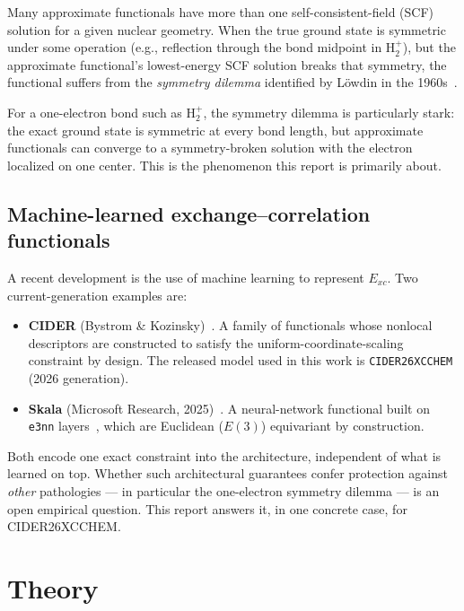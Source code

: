 \documentclass[11pt]{report}
\theoremstyle{definition}
\theoremstyle{remark}
\newcommand{\Exc}{E_{xc}}
\begin{document}
Many approximate functionals have more than one self-consistent-field (SCF)
solution for a given nuclear geometry. When the true ground state is
symmetric under some operation (e.g., reflection through the bond midpoint
in H$_2^+$), but the approximate functional's lowest-energy SCF solution
breaks that symmetry, the functional suffers from the \emph{symmetry
dilemma} identified by L\"owdin in the 1960s~\cite{Lowdin1963}.

For a one-electron bond such as H$_2^+$, the symmetry dilemma is
particularly stark: the exact ground state is symmetric at every bond
length, but approximate functionals can converge to a symmetry-broken
solution with the electron localized on one center. This is the phenomenon
this report is primarily about.

\section{Machine-learned exchange--correlation functionals}

A recent development is the use of machine learning to represent $\Exc$.
Two current-generation examples are:

\begin{itemize}
  \item \textbf{CIDER} (Bystrom \& Kozinsky)~\cite{CIDER2022,CIDER2024,CIDER26}. A family of functionals whose
        nonlocal descriptors are constructed to satisfy the
        uniform-coordinate-scaling constraint by design. The released
        model used in this work is \texttt{CIDER26XCCHEM} (2026
        generation).
  \item \textbf{Skala} (Microsoft Research, 2025)~\cite{Skala2025}. A neural-network
        functional built on \texttt{e3nn} layers~\cite{e3nn}, which are Euclidean
        ($E(3)$) equivariant by construction.
\end{itemize}

Both encode one exact constraint into the architecture, independent of what
is learned on top. Whether such architectural guarantees confer protection
against \emph{other} pathologies --- in particular the one-electron
symmetry dilemma --- is an open empirical question. This report answers it,
in one concrete case, for CIDER26XCCHEM.

\chapter{Theory}
\label{ch:theory}
\end{document}
